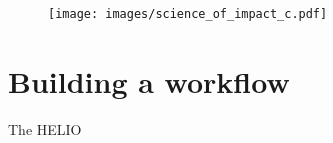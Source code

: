 \documentclass[namedreferences]{SolarPhysics}
\begin{document}
\begin{article}
\begin{figure} 
\centerline{\texttt{[image: images/science\_of\_impact\_c.pdf]}}
\caption{}%
\end{figure}

\section{Building a workflow}

The HELIO




%



%
  

%



%
%


%
%
% 
%   
%
%
%   
%  

\end{article} 
\end{document}
